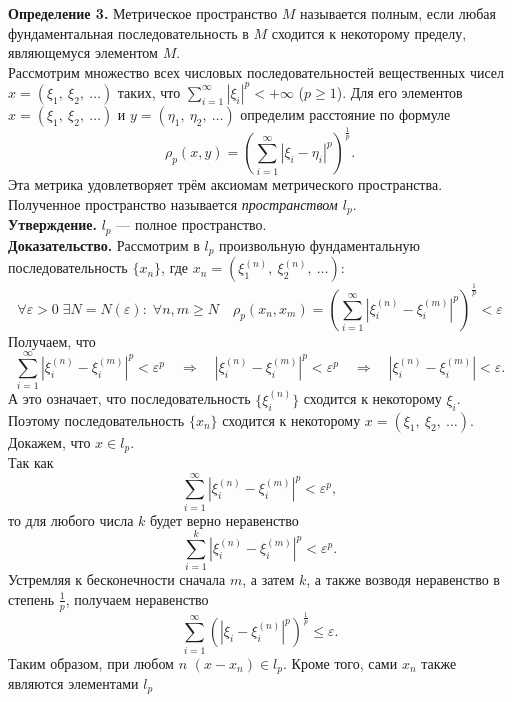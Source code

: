 \documentclass[12pt,a4paper, titlepage]{article}
\begin{document}
\textbf{Определение 3.} Метрическое пространство $M$ называется полным, если любая фундаментальная последовательность в $M$ сходится к некоторому пределу, являющемуся элементом $M$.\\

Рассмотрим множество всех числовых последовательностей вещественных чисел $x = (\xi_1,\ \xi_2,\ \dots )$ таких, что $\sum\limits_{i=1}^\infty | \xi_i |^p < + \infty$ ($p \geqslant 1$). Для его элементов $x = (\xi_1,\ \xi_2,\ \dots )$ и $y = (\eta_1,\ \eta_2,\ \dots )$ определим расстояние по формуле
$$
\rho_p(x, y) = \left(\sum_{i=1}^\infty |\xi_i - \eta_i|^p \right)^{\frac 1 p}.
$$
Эта метрика удовлетворяет трём аксиомам метрического пространства. Полученное пространство называется \textit{пространством $l_p$}.\\

\textbf{Утверждение.} $l_p$ --- полное пространство.\\
\textbf{Доказательство.} Рассмотрим в $l_p$ произвольную фундаментальную последовательность $\lbrace x_n \rbrace$, где $x_n = (\xi_1^{(n)},\ \xi_2^{(n)},\ \dots )$:
$$
\forall \varepsilon > 0 \; \exists N = N(\varepsilon): \; \forall n, m \geqslant N \quad
\rho_p(x_n, x_m) = \left(\sum_{i=1}^\infty |\xi_i^{(n)} - \xi_i^{(m)}|^p \right)^{\frac 1 p} < \varepsilon
$$
Получаем, что
$$
\sum_{i=1}^\infty |\xi_i^{(n)} - \xi_i^{(m)}|^p < \varepsilon^p \quad \Rightarrow \quad
|\xi_i^{(n)} - \xi_i^{(m)}|^p  < \varepsilon^p \quad \Rightarrow \quad |\xi_i^{(n)} - \xi_i^{(m)}|  < \varepsilon.
$$
А это означает, что последовательность $\lbrace \xi_i^{(n)} \rbrace$ сходится к некоторому $\xi_i$. Поэтому последовательность $\lbrace x_n \rbrace$ сходится к некоторому $x = (\xi_1,\ \xi_2,\ \dots )$. Докажем, что $x \in l_p$.\\

Так как
$$
\sum_{i=1}^\infty |\xi_i^{(n)} - \xi_i^{(m)}|^p < \varepsilon^p,
$$
то для любого числа $k$ будет верно неравенство
$$
\sum_{i=1}^k |\xi_i^{(n)} - \xi_i^{(m)}|^p < \varepsilon^p.
$$
Устремляя к бесконечности сначала $m$, а затем $k$, а также возводя неравенство в степень $\frac 1 p$, получаем неравенство
$$
\sum_{i=1}^\infty \left( | \xi_i - \xi_i^{(n)} |^p \right)^{\frac 1 p} \leqslant \varepsilon.
$$
Таким образом, при любом $n$ $(x - x_n) \in l_p$. Кроме того, сами $x_n$ также являются элементами $l_p$\\
\end{document}
